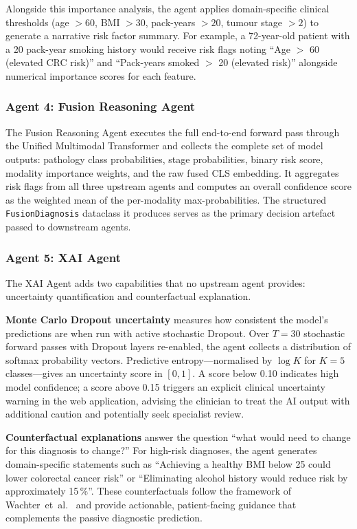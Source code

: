 \documentclass[conference]{IEEEtran}
\begin{document}
Alongside this importance analysis, the agent applies domain-specific
clinical thresholds (age $>60$, BMI $>30$, pack-years $>20$, tumour stage
$>2$) to generate a narrative risk factor summary. For example, a 72-year-old
patient with a 20 pack-year smoking history would receive risk flags noting
``Age $>$ 60 (elevated CRC risk)'' and ``Pack-years smoked $>$ 20 (elevated
risk)'' alongside numerical importance scores for each feature.

\subsubsection{Agent 4: Fusion Reasoning Agent}

The Fusion Reasoning Agent executes the full end-to-end forward pass through
the Unified Multimodal Transformer and collects the complete set of model
outputs: pathology class probabilities, stage probabilities, binary risk score,
modality importance weights, and the raw fused CLS embedding. It aggregates
risk flags from all three upstream agents and computes an overall confidence
score as the weighted mean of the per-modality max-probabilities. The structured
\texttt{FusionDiagnosis} dataclass it produces serves as the primary
decision artefact passed to downstream agents.

\subsubsection{Agent 5: XAI Agent}

The XAI Agent adds two capabilities that no upstream agent provides:
uncertainty quantification and counterfactual explanation.

\textbf{Monte Carlo Dropout uncertainty} measures how consistent the model's
predictions are when run with active stochastic Dropout. Over $T\!=\!30$
stochastic forward passes with Dropout layers re-enabled, the agent collects
a distribution of softmax probability vectors. Predictive entropy---normalised
by $\log K$ for $K\!=\!5$ classes---gives an uncertainty score in $[0,1]$.
A score below 0.10 indicates high model confidence; a score above 0.15
triggers an explicit clinical uncertainty warning in the web application,
advising the clinician to treat the AI output with additional caution and
potentially seek specialist review.

\textbf{Counterfactual explanations} answer the question ``what would need
to change for this diagnosis to change?'' For high-risk diagnoses, the agent
generates domain-specific statements such as ``Achieving a healthy BMI below
25 could lower colorectal cancer risk'' or ``Eliminating alcohol history
would reduce risk by approximately 15\,\%''. These counterfactuals follow
the framework of Wachter~et~al.~\cite{wachter2017} and provide actionable,
patient-facing guidance that complements the passive diagnostic prediction.
\end{document}
